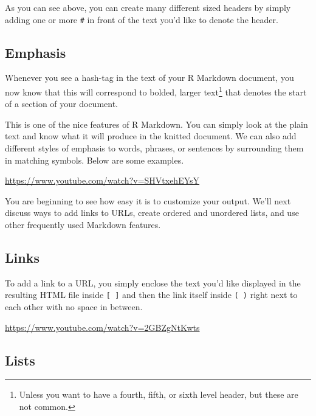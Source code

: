 \documentclass[]{tufte-book}
\begin{document}
As you can see above, you can create many different sized headers by simply adding one or more \texttt{\#} in front of the text you'd like to denote the header.

\hypertarget{emphasis}{%
\subsection{Emphasis}\label{emphasis}}

Whenever you see a hash-tag in the text of your R Markdown document, you now know that this will correspond to bolded, larger text\footnote{Unless you want to have a fourth, fifth, or sixth level header, but these are not common.} that denotes the start of a section of your document.

This is one of the nice features of R Markdown. You can simply look at the plain text and know what it will produce in the knitted document. We can also add different styles of emphasis to words, phrases, or sentences by surrounding them in matching symbols. Below are some examples.

\vspace{0.1in}\begin{center}\footnotesize{\url{https://www.youtube.com/watch?v=SHVtxehEYsY}}\end{center}\vspace{0.1in}

You are beginning to see how easy it is to customize your output. We'll next discuss ways to add links to URLs, create ordered and unordered lists, and use other frequently used Markdown features.

\hypertarget{links}{%
\subsection{Links}\label{links}}

To add a link to a URL, you simply enclose the text you'd like displayed in the resulting HTML file inside \texttt{{[}\ {]}} and then the link itself inside \texttt{(\ )} right next to each other with no space in between.

\vspace{0.1in}\begin{center}\footnotesize{\url{https://www.youtube.com/watch?v=2GBZgNtKwts}}\end{center}\vspace{0.1in}

\hypertarget{lists}{%
\subsection{Lists}\label{lists}}
\end{document}
